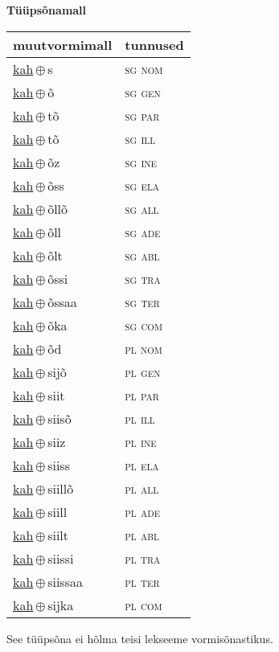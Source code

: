 

\vspace{3.5em}
\noindent \begin{minipage}{\textwidth}
\noindent \textbf{Tüüpsõnamall \,}\\

\begin{sideways}
\begin{tabular}{l l}
muutvormimall & tunnused \\
\hline
\underline{kah}\,$\oplus$\,s & \textsc{ sg nom } \\
\underline{kah}\,$\oplus$\,õ & \textsc{ sg gen } \\
\underline{kah}\,$\oplus$\,tõ & \textsc{ sg par } \\
\underline{kah}\,$\oplus$\,tõ & \textsc{ sg ill } \\
\underline{kah}\,$\oplus$\,õz & \textsc{ sg ine } \\
\underline{kah}\,$\oplus$\,õss & \textsc{ sg ela } \\
\underline{kah}\,$\oplus$\,õllõ & \textsc{ sg all } \\
\underline{kah}\,$\oplus$\,õll & \textsc{ sg ade } \\
\underline{kah}\,$\oplus$\,õlt & \textsc{ sg abl } \\
\underline{kah}\,$\oplus$\,õssi & \textsc{ sg tra } \\
\underline{kah}\,$\oplus$\,õssaa & \textsc{ sg ter } \\
\underline{kah}\,$\oplus$\,õka & \textsc{ sg com } \\
\underline{kah}\,$\oplus$\,õd & \textsc{ pl nom } \\
\underline{kah}\,$\oplus$\,sijõ & \textsc{ pl gen } \\
\underline{kah}\,$\oplus$\,siit & \textsc{ pl par } \\
\underline{kah}\,$\oplus$\,siisõ & \textsc{ pl ill } \\
\underline{kah}\,$\oplus$\,siiz & \textsc{ pl ine } \\
\underline{kah}\,$\oplus$\,siiss & \textsc{ pl ela } \\
\underline{kah}\,$\oplus$\,siillõ & \textsc{ pl all } \\
\underline{kah}\,$\oplus$\,siill & \textsc{ pl ade } \\
\underline{kah}\,$\oplus$\,siilt & \textsc{ pl abl } \\
\underline{kah}\,$\oplus$\,siissi & \textsc{ pl tra } \\
\underline{kah}\,$\oplus$\,siissaa & \textsc{ pl ter } \\
\underline{kah}\,$\oplus$\,sijka & \textsc{ pl com } \\
\end{tabular}
\end{sideways}
\label{tab:tüüpsõnamall-kahs}

\end{minipage}

 
\vspace{1em}
\noindent See tüüpsõna ei hõlma teisi lekseeme vormi\-sõnastikus.
